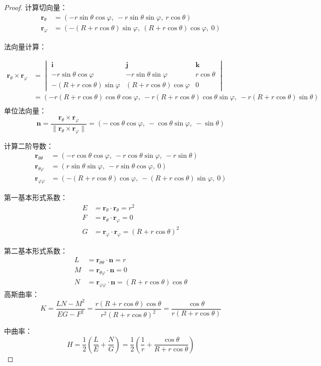 \documentclass[lang=cn,10pt,thmcnt=section]{elegantbook}
\begin{document}
\begin{proof}
    计算切向量：
\begin{align*}
\bm{r}_\theta &= (-r \sin\theta \cos\varphi,\ -r \sin\theta \sin\varphi,\ r \cos\theta) \\
\bm{r}_\varphi &= (-(R + r \cos\theta) \sin\varphi,\ (R + r \cos\theta) \cos\varphi,\ 0)
\end{align*}

法向量计算：

\begin{align*}
    \bm{r}_\theta \times \bm{r}_\varphi &= \begin{vmatrix}
        \bm{i} & \bm{j} & \bm{k} \\
        -r \sin\theta \cos\varphi & -r \sin\theta \sin\varphi & r \cos\theta \\
        -(R + r \cos\theta)\sin\varphi & (R + r \cos\theta)\cos\varphi & 0
        \end{vmatrix}\\
        &= (-r(R + r \cos\theta)\cos\theta\cos\varphi,\ -r(R + r \cos\theta)\cos\theta\sin\varphi,\ -r(R + r \cos\theta)\sin\theta) \\
\end{align*}
单位法向量：
\[
\bm{n} = \frac{\bm{r}_\theta \times \bm{r}_\varphi}{\|\bm{r}_\theta \times \bm{r}_\varphi\|} = (-\cos\theta\cos\varphi,\ -\cos\theta\sin\varphi,\ -\sin\theta)
\]

计算二阶导数：
\begin{align*}
\bm{r}_{\theta\theta} &= (-r \cos\theta \cos\varphi,\ -r \cos\theta \sin\varphi,\ -r \sin\theta) \\
\bm{r}_{\theta\varphi} &= (r \sin\theta \sin\varphi,\ -r \sin\theta \cos\varphi,\ 0) \\
\bm{r}_{\varphi\varphi} &= (-(R + r \cos\theta) \cos\varphi,\ -(R + r \cos\theta) \sin\varphi,\ 0)
\end{align*}


第一基本形式系数：
\begin{align*}
E &= \bm{r}_\theta \cdot \bm{r}_\theta = r^2 \\
F &= \bm{r}_\theta \cdot \bm{r}_\varphi = 0 \\
G &= \bm{r}_\varphi \cdot \bm{r}_\varphi = (R + r \cos\theta)^2
\end{align*}

第二基本形式系数：
\begin{align*}
L &= \bm{r}_{\theta\theta} \cdot \bm{n} = r \\ 
M &= \bm{r}_{\theta\varphi} \cdot \bm{n} = 0 \\
N &= \bm{r}_{\varphi\varphi} \cdot \bm{n} = (R + r \cos\theta)\cos\theta
\end{align*}
高斯曲率：
\[
K = \frac{LN - M^2}{EG - F^2} = \frac{r(R + r \cos\theta)\cos\theta}{r^2(R + r \cos\theta)^2} = \frac{\cos\theta}{r(R + r \cos\theta)}
\]

中曲率：
\[
H = \frac{1}{2}\left(\frac{L}{E} + \frac{N}{G}\right) = \frac{1}{2}\left(\frac{1}{r} + \frac{\cos\theta}{R + r \cos\theta}\right)
\]
\end{proof}
\end{document}
